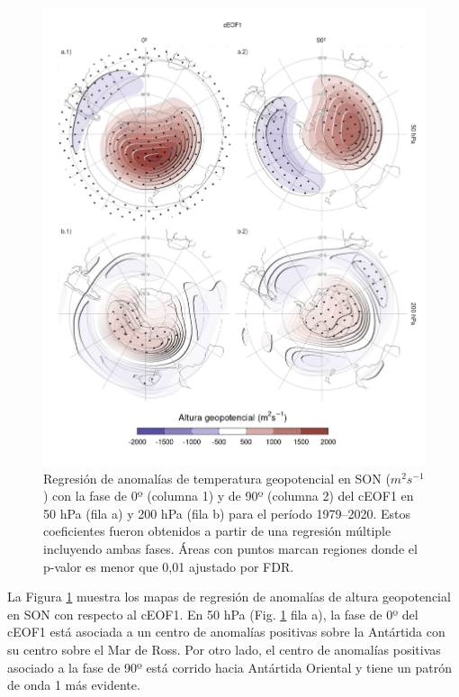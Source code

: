 \documentclass[12pt,oneside,a4paper]{reedthesis}
\begin{document}
\begin{figure}

{\centering \includegraphics{figures/20-ceofs/eof1-regr-gh-1} 

}

\caption{Regresión de anomalías de temperatura geopotencial en SON (\(m^2s^{-1}\)) con la fase de 0º (columna 1) y de 90º (columna 2) del cEOF1 en 50 hPa (fila a) y 200 hPa (fila b) para el período 1979--2020. Estos coeficientes fueron obtenidos a partir de una regresión múltiple incluyendo ambas fases. Áreas con puntos marcan regiones donde el p-valor es menor que 0,01 ajustado por FDR.}\label{fig:eof1-regr-gh}
\end{figure}

La Figura \ref{fig:eof1-regr-gh} muestra los mapas de regresión de anomalías de altura geopotencial en SON con respecto al cEOF1.
En 50 hPa (Fig. \ref{fig:eof1-regr-gh} fila a), la fase de 0º del cEOF1 está asociada a un centro de anomalías positivas sobre la Antártida con su centro sobre el Mar de Ross.
Por otro lado, el centro de anomalías positivas asociado a la fase de 90º está corrido hacia Antártida Oriental y tiene un patrón de onda 1 más evidente.
\end{document}
